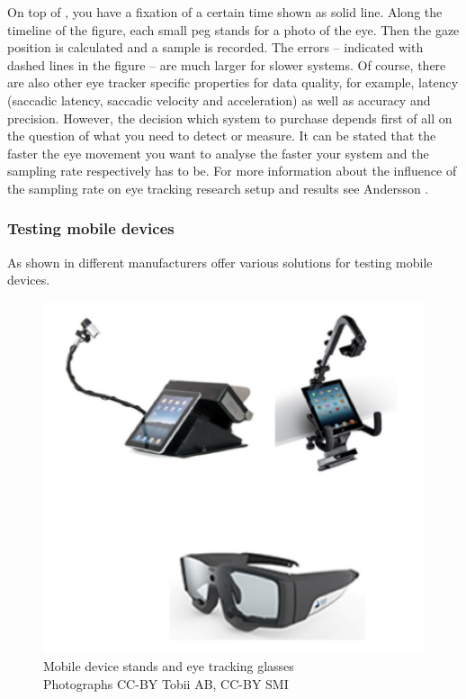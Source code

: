 \documentclass[output=paper]{langsci/langscibook}
\begin{document}
On top of , you have a fixation of a certain time shown as solid line. Along the timeline of the figure, each small peg stands for a photo of the eye. Then the gaze position is calculated and a sample is recorded. The errors -- indicated with dashed lines in the figure -- are much larger for slower systems. Of course, there are also other eye tracker specific properties for data quality, for example, latency (saccadic latency, saccadic velocity and acceleration) as well as accuracy and precision. However, the decision which system to purchase depends first of all on the question of what you need to detect or measure. It can be stated that the faster the eye movement you want to analyse the faster your system and the sampling rate respectively has to be. For more information about the influence of the sampling rate on eye tracking research setup and results see Andersson \citep[cf.][]{Andersson2009}. 

\subsubsection{Testing mobile devices}

As shown in  different manufacturers offer various solutions for testing mobile devices. 

\begin{figure}
 \includegraphics[width=\textwidth]{figures/Roesener5.png}
 \caption{Mobile device stands and eye tracking glasses \citep{Tobii2014, SMI2014} \\{\scriptsize Photographs CC-BY Tobii AB, CC-BY SMI}}
 \label{roesener:fig:5}
\end{figure} 
\end{document}
